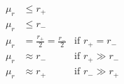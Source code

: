 \begin{eqnarray}
\mu_r&  \leq r_+ \\
\mu_r & \leq r_- \\
\mu_r &= \frac{r_+}{2} = \frac{r_-}{2} & \text{if } r_+ = r_- \\
\mu_r &\approx r_- & \text{if } r_+ \gg r_- \\
\mu_r &\approx r_+ & \text{if } r_- \gg r_+ \\
\end{eqnarray}